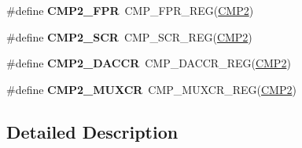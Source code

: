 \begin{DoxyCompactItemize}
\item 
\#define {\bfseries C\+M\+P2\+\_\+\+F\+PR}~C\+M\+P\+\_\+\+F\+P\+R\+\_\+\+R\+EG(\hyperlink{group__CMP__Peripheral__Access__Layer_ga023ff9e161b651f7f47e0457fe0c1fcb}{C\+M\+P2})\hypertarget{group__CMP__Register__Accessor__Macros_ga9dc777b96070e089202af634a3da0feb}{}\label{group__CMP__Register__Accessor__Macros_ga9dc777b96070e089202af634a3da0feb}

\item 
\#define {\bfseries C\+M\+P2\+\_\+\+S\+CR}~C\+M\+P\+\_\+\+S\+C\+R\+\_\+\+R\+EG(\hyperlink{group__CMP__Peripheral__Access__Layer_ga023ff9e161b651f7f47e0457fe0c1fcb}{C\+M\+P2})\hypertarget{group__CMP__Register__Accessor__Macros_ga3fecb254542d1ea6f149b0b42c31fc53}{}\label{group__CMP__Register__Accessor__Macros_ga3fecb254542d1ea6f149b0b42c31fc53}

\item 
\#define {\bfseries C\+M\+P2\+\_\+\+D\+A\+C\+CR}~C\+M\+P\+\_\+\+D\+A\+C\+C\+R\+\_\+\+R\+EG(\hyperlink{group__CMP__Peripheral__Access__Layer_ga023ff9e161b651f7f47e0457fe0c1fcb}{C\+M\+P2})\hypertarget{group__CMP__Register__Accessor__Macros_gac57bbed7635a10b34a5db2372b7a21ea}{}\label{group__CMP__Register__Accessor__Macros_gac57bbed7635a10b34a5db2372b7a21ea}

\item 
\#define {\bfseries C\+M\+P2\+\_\+\+M\+U\+X\+CR}~C\+M\+P\+\_\+\+M\+U\+X\+C\+R\+\_\+\+R\+EG(\hyperlink{group__CMP__Peripheral__Access__Layer_ga023ff9e161b651f7f47e0457fe0c1fcb}{C\+M\+P2})\hypertarget{group__CMP__Register__Accessor__Macros_gaefb6742f070600e76e40da89916a80e3}{}\label{group__CMP__Register__Accessor__Macros_gaefb6742f070600e76e40da89916a80e3}

\end{DoxyCompactItemize}


\subsection{Detailed Description}
